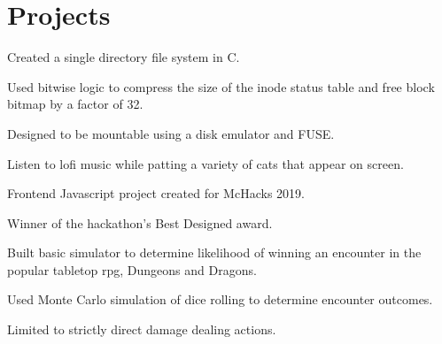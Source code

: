 \documentclass[]{willguthrie-resume}
\begin{document}
\begin{minipage}[t]{0.66\textwidth}
	
	\sectionsep
	\section{Projects}

	\begin{tightemize}
		\item Created a single directory file system in C.
		\item Used bitwise logic to compress the size of the inode status table and free block bitmap by a factor of 32.
		\item Designed to be mountable using a disk emulator and FUSE.
	\end{tightemize}

	\begin{tightemize}
		\item Listen to lofi music while patting a variety of cats that appear on screen.
		\item Frontend Javascript project created for McHacks 2019.
		\item Winner of the hackathon's Best Designed award.
	\end{tightemize}

	\begin{tightemize}
		\item Built basic simulator to determine likelihood of winning an encounter in the popular tabletop rpg, Dungeons and Dragons.
		\item Used Monte Carlo simulation of dice rolling to determine encounter outcomes.
		\item Limited to strictly direct damage dealing actions.
	\end{tightemize}


\end{minipage}
\end{document}
